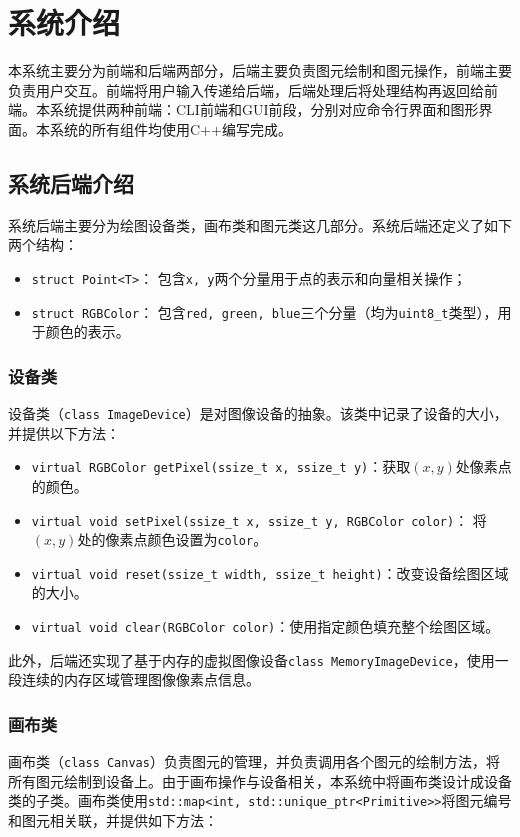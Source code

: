 \documentclass[a4paper,12pt]{article}
\begin{document}
\section{系统介绍}

本系统主要分为前端和后端两部分，后端主要负责图元绘制和图元操作，前端主要负责用户交互。前端将用户输入传递给后端，后端处理后将处理结构再返回给前端。本系统提供两种前端：CLI前端和GUI前段，分别对应命令行界面和图形界面。本系统的所有组件均使用C++编写完成。

\subsection{系统后端介绍}
系统后端主要分为绘图设备类，画布类和图元类这几部分。系统后端还定义了如下两个结构：
\begin{itemize}
	\item \lstinline|struct Point<T>|： 包含\lstinline|x, y|两个分量用于点的表示和向量相关操作；
	\item \lstinline|struct RGBColor|： 包含\lstinline|red, green, blue|三个分量（均为\lstinline|uint8_t|类型），用于颜色的表示。
\end{itemize}

\subsubsection{设备类}
设备类（\lstinline|class ImageDevice|）是对图像设备的抽象。该类中记录了设备的大小，并提供以下方法：

\begin{itemize}
	\item \lstinline|virtual RGBColor getPixel(ssize_t x, ssize_t y)|：获取$(x, y)$处像素点的颜色。
	\item \lstinline|virtual void setPixel(ssize_t x, ssize_t y, RGBColor color)|： 将$(x, y)$处的像素点颜色设置为\lstinline|color|。
	\item \lstinline|virtual void reset(ssize_t width, ssize_t height)|：改变设备绘图区域的大小。
	\item \lstinline|virtual void clear(RGBColor color)|：使用指定颜色填充整个绘图区域。
\end{itemize}

此外，后端还实现了基于内存的虚拟图像设备\lstinline|class MemoryImageDevice|，使用一段连续的内存区域管理图像像素点信息。

\subsubsection{画布类}
画布类（\lstinline|class Canvas|）负责图元的管理，并负责调用各个图元的绘制方法，将所有图元绘制到设备上。由于画布操作与设备相关，本系统中将画布类设计成设备类的子类。画布类使用\lstinline|std::map<int, std::unique_ptr<Primitive>>|将图元编号和图元相关联，并提供如下方法：
\end{document}

